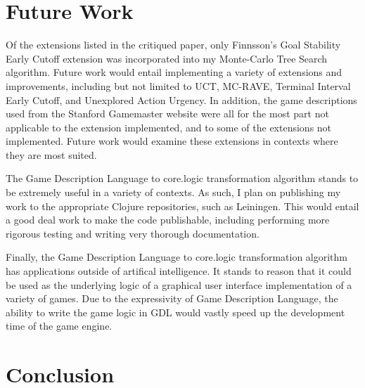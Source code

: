 \documentclass[letterpaper]{article}
\begin{document}
\section{Future Work}

Of the extensions listed in the critiqued paper, only Finnsson's Goal Stability Early Cutoff extension was incorporated into my Monte-Carlo Tree Search algorithm. Future work would entail implementing a variety of extensions and improvements, including but not limited to UCT, MC-RAVE, Terminal Interval Early Cutoff, and Unexplored Action Urgency. In addition, the game descriptions used from the Stanford Gamemaster website were all for the most part not applicable to the extension implemented, and to some of the extensions not implemented. Future work would examine these extensions in contexts where they are most suited.

The Game Description Language to core.logic transformation algorithm stands to be extremely useful in a variety of contexts. As such, I plan on publishing my work to the appropriate Clojure repositories, such as Leiningen. This would entail a good deal work to make the code publishable, including performing more rigorous testing and writing very thorough documentation.

Finally, the Game Description Language to core.logic transformation algorithm has applications outside of artifical intelligence. It stands to reason that it could be used as the underlying logic of a graphical user interface implementation of a variety of games. Due to the expressivity of Game Description Language, the ability to write the game logic in GDL would vastly speed up the development time of the game engine.

\section{Conclusion}



\end{document}

